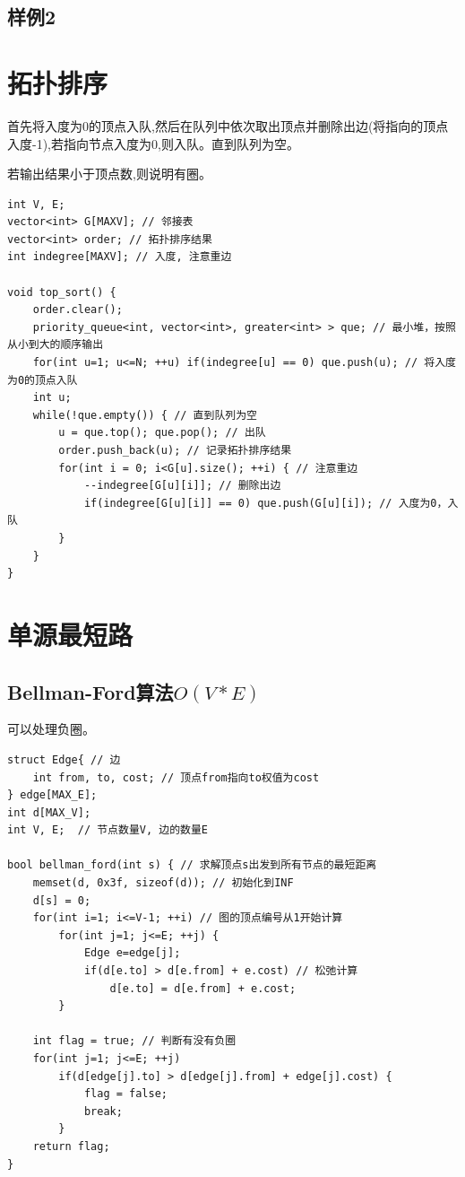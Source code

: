 \documentclass[a4paper]{ctexrep}
\begin{document}
\subsection{样例2}
\section{拓扑排序}
首先将入度为0的顶点入队,然后在队列中依次取出顶点并删除出边(将指向的顶点入度-1),若指向节点入度为0,则入队。直到队列为空。

若输出结果小于顶点数,则说明有圈。

\begin{lstlisting}
int V, E;
vector<int> G[MAXV]; // 邻接表
vector<int> order; // 拓扑排序结果
int indegree[MAXV]; // 入度, 注意重边

void top_sort() {
	order.clear();
	priority_queue<int, vector<int>, greater<int> > que; // 最小堆，按照从小到大的顺序输出
	for(int u=1; u<=N; ++u) if(indegree[u] == 0) que.push(u); // 将入度为0的顶点入队
	int u;
	while(!que.empty()) { // 直到队列为空
		u = que.top(); que.pop(); // 出队
		order.push_back(u); // 记录拓扑排序结果
		for(int i = 0; i<G[u].size(); ++i) { // 注意重边
			--indegree[G[u][i]]; // 删除出边
			if(indegree[G[u][i]] == 0) que.push(G[u][i]); // 入度为0，入队
		}
	}
}
\end{lstlisting}

\section{单源最短路}
\subsection{Bellman-Ford算法$O(V*E)$}
可以处理负圈。

\begin{lstlisting}
struct Edge{ // 边
	int from, to, cost; // 顶点from指向to权值为cost
} edge[MAX_E];
int d[MAX_V];
int V, E;  // 节点数量V, 边的数量E

bool bellman_ford(int s) { // 求解顶点s出发到所有节点的最短距离
	memset(d, 0x3f, sizeof(d)); // 初始化到INF
	d[s] = 0;
	for(int i=1; i<=V-1; ++i) // 图的顶点编号从1开始计算
		for(int j=1; j<=E; ++j) {
			Edge e=edge[j];
			if(d[e.to] > d[e.from] + e.cost) // 松弛计算
				d[e.to] = d[e.from] + e.cost;
		}

	int flag = true; // 判断有没有负圈
	for(int j=1; j<=E; ++j)
		if(d[edge[j].to] > d[edge[j].from] + edge[j].cost) {
			flag = false;
			break;
		}
	return flag;
}
\end{lstlisting}
\end{document}

